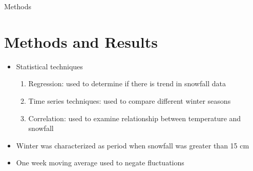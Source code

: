 \documentclass{beamer}
\begin{document}
\begin{frame}{Methods}

\section{Methods and Results}

\begin{itemize}

\item Statistical techniques 
\begin{enumerate}
\item Regression: used to determine if there is trend in snowfall data
\item Time series techniques: used to compare different winter seasons
\item Correlation: used to examine relationship between temperature and snowfall
\end{enumerate}

\item Winter was characterized as period when snowfall was greater than 15 cm
\item One week moving average used to negate fluctuations
\end{itemize}

\end{frame}
\end{document}
